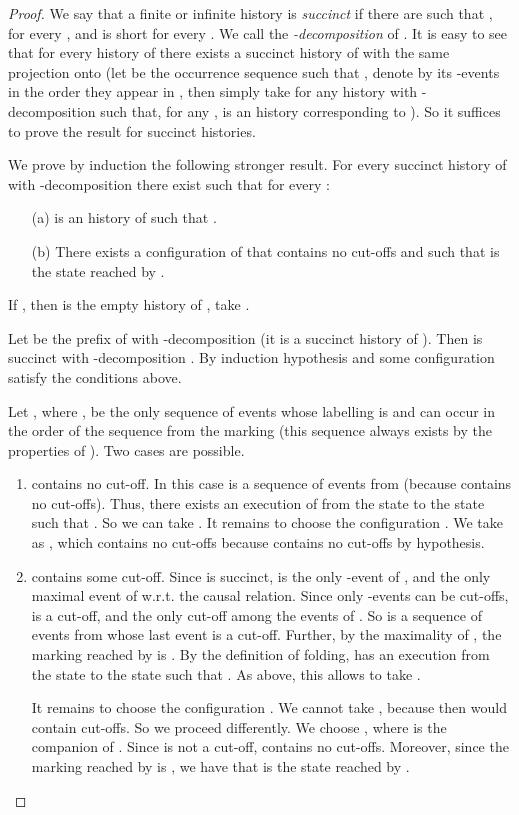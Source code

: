 \documentclass{llncs}
\begin{document}
\begin{proof}
We say that a finite or infinite history  is {\em succinct} if there are  such that 
,  for every , and  is short for every .
We call  the {\em -decomposition} of .
It is easy to see that for every history  of  there exists a succinct history  of  with the same 
projection onto  (let  be the occurrence sequence such that , denote by  its -events in the order they appear in , then simply take for  any history with -decomposition  such that, for any ,  is an history corresponding to ).
So it suffices to prove the result for 
succinct histories. 

We prove by induction the following stronger result.
For every succinct history of  with -decomposition  there exist  such that for every :
\begin{enumerate}
\item[(a)]  is an history of  such that .
\item[(b)] There exists a configuration  of  that contains no cut-offs and such that
 is the state reached by .
\end{enumerate}

If , then  is the empty history of , take .

Let  be the prefix of  with -decomposition  (it is a succinct history of ).
Then  is succinct with -decomposition . 
By induction hypothesis  and some configuration 
satisfy the conditions above. 

Let , where ,  be the only sequence of events 
whose labelling is  and can occur in the order of the sequence from the marking  
(this sequence always exists by the properties of ). 
Two cases are possible.
\begin{enumerate}
\item  contains no cut-off.
In this case  is a sequence of events from  (because  contains no cut-offs). 
Thus, there exists an execution  of  from the state  
to the state  such that .
So we can take .
It remains to choose the configuration . We take  as ,
which contains no cut-offs because  contains no cut-offs by hypothesis.
\item  contains some cut-off.
Since  is succinct,  is the only -event of , and the only
maximal event of  w.r.t. the causal relation. Since
only -events can be cut-offs,  is a cut-off, and the only cut-off among the events of
. So  is a sequence of events from  whose last event is a cut-off.
Further, by the maximality of , the marking reached by  is .
By the definition of folding,  has an execution  from the state 
 to the state  such that 
. As above, this allows to take .

It remains to choose the configuration . We cannot take 
, because then  would contain cut-offs. 
So we proceed differently. We choose , where  is the companion of . 
Since  is not a cut-off,  contains no cut-offs. Moreover, since the marking 
reached by  is , we have that  is the state reached by 
.
\end{enumerate}
\end{proof}
\end{document}
